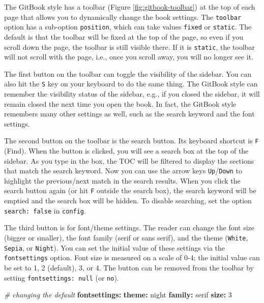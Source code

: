 \documentclass[
  12pt,
]{krantz}
\newenvironment{Shaded}{\begin{snugshade}}{\end{snugshade}}
\newcommand{\AttributeTok}[1]{\textcolor[rgb]{0.13,0.29,0.53}{#1}}
\newcommand{\CommentTok}[1]{\textcolor[rgb]{0.56,0.35,0.01}{\textit{#1}}}
\newcommand{\DecValTok}[1]{\textcolor[rgb]{0.00,0.00,0.81}{#1}}
\newcommand{\FunctionTok}[1]{\textcolor[rgb]{0.13,0.29,0.53}{\textbf{#1}}}
\newcommand{\KeywordTok}[1]{\textcolor[rgb]{0.13,0.29,0.53}{\textbf{#1}}}
\theoremstyle{definition}
\theoremstyle{definition}
\theoremstyle{definition}
\theoremstyle{definition}
\theoremstyle{remark}
\begin{document}
The GitBook style has a toolbar (Figure \ref{fig:gitbook-toolbar}) at the top of each page that allows you to dynamically change the book settings. The \texttt{toolbar} option has a sub-option \texttt{position}, which can take values \texttt{fixed} or \texttt{static}. The default is that the toolbar will be fixed at the top of the page, so even if you scroll down the page, the toolbar is still visible there. If it is \texttt{static}, the toolbar will not scroll with the page, i.e., once you scroll away, you will no longer see it.

The first button on the toolbar can toggle the visibility of the sidebar. You can also hit the \texttt{S} key on your keyboard to do the same thing. The GitBook style can remember the visibility status of the sidebar, e.g., if you closed the sidebar, it will remain closed the next time you open the book. In fact, the GitBook style remembers many other settings as well, such as the search keyword and the font settings.

The second button on the toolbar is the search button. Its keyboard shortcut is \texttt{F} (Find). When the button is clicked, you will see a search box at the top of the sidebar. As you type in the box, the TOC will be filtered to display the sections that match the search keyword. Now you can use the arrow keys \texttt{Up}/\texttt{Down} to highlight the previous/next match in the search results. When you click the search button again (or hit \texttt{F} outside the search box), the search keyword will be emptied and the search box will be hidden. To disable searching, set the option \texttt{search:\ false} in \texttt{config}.

The third button is for font/theme settings. The reader can change the font size (bigger or smaller), the font family (serif or sans serif), and the theme (\texttt{White}, \texttt{Sepia}, or \texttt{Night}). You can set the initial value of these settings via the \texttt{fontsettings} option. Font size is measured on a scale of 0-4; the initial value can be set to 1, 2 (default), 3, or 4. The button can be removed from the toolbar by setting \texttt{fontsettings:\ null} (or \texttt{no}).

\begin{Shaded}
\begin{Highlighting}[]
\CommentTok{\# changing the default}
\AttributeTok{    }\FunctionTok{fontsettings}\KeywordTok{:}
\AttributeTok{      }\FunctionTok{theme}\KeywordTok{:}\AttributeTok{ night}
\AttributeTok{      }\FunctionTok{family}\KeywordTok{:}\AttributeTok{ serif}
\AttributeTok{      }\FunctionTok{size}\KeywordTok{:}\AttributeTok{ }\DecValTok{3}
\end{Highlighting}
\end{Shaded}
\end{document}
